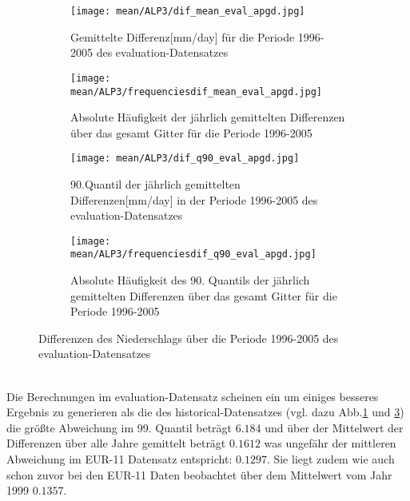 \begin{figure}[hbt!]
	\begin{subfigure}{0.49\textwidth}
		\texttt{[image: mean/ALP3/dif\_mean\_eval\_apgd.jpg]}
		\caption{Gemittelte Differenz[mm/day] für die Periode 1996-2005 des evaluation-Datensatzes}
		\label{fig:dif_eval_apgd_mean}
	\end{subfigure}
	\begin{subfigure}{0.49\textwidth}
		\texttt{[image: mean/ALP3/frequenciesdif\_mean\_eval\_apgd.jpg]}
		\caption{Absolute Häufigkeit der jährlich gemittelten Differenzen über das gesamt Gitter für die Periode 1996-2005}
		\label{fig:freq_dif_eval_apgd_mean}
	\end{subfigure}
	\begin{subfigure}{0.49\textwidth}
		\texttt{[image: mean/ALP3/dif\_q90\_eval\_apgd.jpg]}
		\caption{90.Quantil der jährlich gemittelten Differenzen[mm/day] in der Periode 1996-2005 des evaluation-Datensatzes}
		\label{fig:dif_eval_apgd_q90}
	\end{subfigure}  
	\begin{subfigure}{0.49\textwidth}
		\texttt{[image: mean/ALP3/frequenciesdif\_q90\_eval\_apgd.jpg]}
		\caption{Absolute Häufigkeit des 90. Quantils der jährlich gemittelten Differenzen über das gesamt Gitter für die Periode 1996-2005}
		\label{fig:freq_dif_eval_apgd_q90}
	\end{subfigure}
	\caption{Differenzen des Niederschlags über die Periode 1996-2005 des evaluation-Datensatzes}
	\label{fig:mean_apgd_eval}
\end{figure}
\\
Die Berechnungen im evaluation-Datensatz scheinen ein um einiges besseres Ergebnis zu generieren als die des historical-Datensatzes (vgl. dazu Abb.\ref{fig:dif_eval_apgd_mean} und \ref{fig:dif_eval_apgd_q90}) die größte Abweichung im 99. Quantil beträgt $6.184$ und über der Mittelwert der Differenzen über alle Jahre gemittelt beträgt $0.1612$ was ungefähr der mittleren Abweichung im EUR-11 Datensatz entspricht: $0.1297$. Sie liegt zudem wie auch schon zuvor bei den EUR-11 Daten beobachtet über dem Mittelwert vom Jahr 1999 $0.1357$.\\
\vfill
\pagebreak[4]
\hfill
\vfill
\pagebreak[4]
\hfill
\vfill
\pagebreak[4]
\vfill
